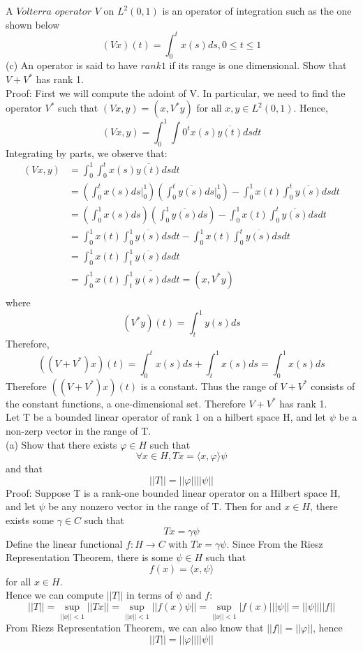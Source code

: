 \documentclass [12pt,letterpaper]{exam}
\begin{document}
\begin{questions}
\question A $Volterra$ $operator$ $V$ on $L^2(0,1)$ is an operator of integration such as the one shown below 
$$(Vx)(t) = \int_{0}^{t} x(s)ds, 0\leq t\leq 1$$
(c) An operator is said to have $rank 1$ if its range is one dimensional. Show that $V + V^*$ has rank 1.\\

Proof: First we will compute the adoint of V. In particular, we need to find the operator $V^*$ such that $(Vx,y) = (x,V^{*}y)$ for all $x,y\in L^{2}(0,1)$. Hence,$$(Vx,y) = \int_{0}^{1}\int{0}^{t} x(s)\overline{y(t)}dsdt$$
Integrating by parts, we observe that:\\
\begin{equation}
\begin{split}
    (Vx,y) &= \int_{0}^{1} \int_{0}^{t} x(s)\overline{y(t)}dsdt\\
    &= (\int_{0}^{t}x(s)ds|_{0}^{1})(\int_{0}^{t}\overline{y(s)}ds|_{0}^{1}) - \int_{0}^{1}x(t)\int_{0}^{t}\overline{y(s)}dsdt\\
&= (\int_{0}^{1}x(s)ds)(\int_{0}^{1}\overline{y(s)}ds) - \int_{0}^{1}x(t)\int_{0}^{t}\overline{y(s)}dsdt\\
&= \int_{0}^{1}x(t)\int_{0}^{1}\overline{y(s)}dsdt - \int_{0}^{1}x(t)\int_{0}^{t}\overline{y(s)}dsdt\\
&= \int_{0}^{1}x(t)\int_{t}^{1}\overline{y(s)}dsdt \\
&= \int_{0}^{1}x(t)\overline{\int_{t}^{1}y(s)dsdt} = (x,V^*y)\\
\end{split}
\end{equation}
where $$(V^*y)(t) = \int_{t}^{1}y(s)ds$$
Therefore, $$((V+V^*)x)(t) = \int_{0}^{t}x(s)ds + \int_{t}^{1}x(s)ds = \int_{0}^{1}x(s)ds$$
Therefore $((V+V^*)x)(t)$ is a constant. Thus the range of $V+V^*$ consists of the constant functions, a one-dimensional set. Therefore $V+V^*$ has rank 1.\\

\question Let T be a bounded linear operator of rank 1 on a hilbert space H, and let $\psi$ be a non-zerp vector in the range of T.\\
(a) Show that there exists $\varphi \in H$ such that
$$\forall x \in H,  Tx = \langle x,\varphi \rangle \psi$$
and that $$||T|| = ||\varphi||||\psi||$$
Proof: Suppose T is a rank-one bounded linear operator on a Hilbert space H, and let $\psi$ be any nonzero vector in the range of T. Then for and $x \in H$, there exists some $\gamma \in C$ such that $$Tx = \gamma\psi$$
Define the linear functional $f: H \rightarrow C$ with $Tx = \gamma\psi$. Since From the Riesz Representation Theorem, there is some $\psi \in H$ such that $$f(x) = \langle x, \psi \rangle$$ for all $x \in H$.\\
Hence we can compute $||T||$ in terms of $\psi$ and $f$:\\
$$||T|| = \sup_{||x||<1}||Tx|| = \sup_{||x||<1}||f(x)\psi|| = \sup_{||x||<1}|f(x)|||\psi|| = ||\psi||||f||$$
From Riezs Representation Theorem, we can also know that $||f|| = ||\varphi||$, hence
$$||T|| = ||\varphi||||\psi||$$


\end{questions}
\end{document}
